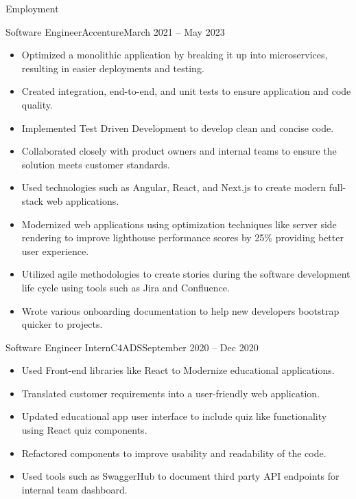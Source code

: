 \documentclass[]{mcdowellcv}
\begin{document}
\begin{cvsection}{Employment}
		\begin{cvsubsection}{Software Engineer}{Accenture}{March 2021 -- May 2023}	
			\begin{itemize}
				\item Optimized a monolithic application by breaking it up into microservices, resulting in easier deployments and testing.
				\item Created integration, end-to-end, and unit tests to ensure application and code quality.
				\item Implemented Test Driven Development to develop clean and concise code.
				\item Collaborated closely with product owners and internal teams to ensure the solution meets customer standards.
				\item Used technologies such as Angular, React, and Next.js to create modern full-stack web applications.
				\item Modernized web applications using optimization techniques like server side rendering to improve lighthouse performance scores by 25\% providing better user experience.
				\item Utilized agile methodologies to create stories during the software development life cycle using tools such as Jira and Confluence.
				\item Wrote various onboarding documentation to help new developers bootstrap quicker to projects.
			\end{itemize}
		\end{cvsubsection}
		
		\begin{cvsubsection}{Software Engineer Intern}{C4ADS}{September 2020 -- Dec 2020}		
			\begin{itemize}
				\item Used Front-end libraries like React to Modernize educational applications.
				\item Translated customer requirements into a user-friendly web application.
				\item Updated educational app user interface to include quiz like functionality using React quiz components.
				\item Refactored components to improve usability and readability of the code.
				\item Used tools such as SwaggerHub to document third party API endpoints for internal team dashboard.
			\end{itemize}
		\end{cvsubsection}
	\end{cvsection}
	
\end{document}
